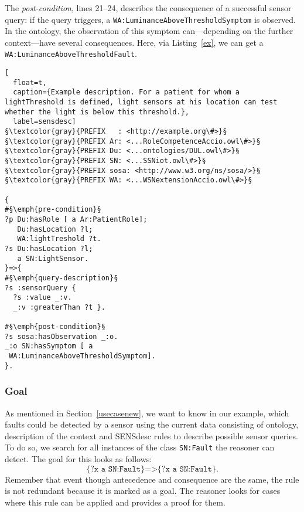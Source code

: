 The \emph{post-condition}, lines 21--24, describes the consequence of a successful sensor query: if the query triggers, a  
\texttt{WA:LuminanceAboveThresholdSymptom} is observed.
In the ontology, the observation of this symptom can---depending on the further context---have several consequences. 
Here, via Listing~\ref{ex}, we can get a \texttt{WA:LuminanceAboveThresholdFault}.

\begin{lstlisting}[
  float=t,
  caption={Example description. For a patient for whom a lightThreshold is defined, light sensors at his location can test whether the light is below this threshold.},
  label=sensdesc]
§\textcolor{gray}{PREFIX   : <http://example.org\#>}§ 
§\textcolor{gray}{PREFIX Ar: <...RoleCompetenceAccio.owl\#>}§
§\textcolor{gray}{PREFIX Du: <...ontologies/DUL.owl\#>}§
§\textcolor{gray}{PREFIX SN: <...SSNiot.owl\#>}§
§\textcolor{gray}{PREFIX sosa: <http://www.w3.org/ns/sosa/>}§
§\textcolor{gray}{PREFIX WA: <...WSNextensionAccio.owl\#>}§

{
#§\emph{pre-condition}§
?p Du:hasRole [ a Ar:PatientRole];
   Du:hasLocation ?l;
   WA:lightTreshold ?t.
?s Du:hasLocation ?l;
   a SN:LightSensor.
}=>{
#§\emph{query-description}§
?s :sensorQuery { 
  ?s :value _:v. 
  _:v :greaterThan ?t }.

#§\emph{post-condition}§
?s sosa:hasObservation _:o.
_:o SN:hasSymptom [ a 
 WA:LuminanceAboveThresholdSymptom].
}.
\end{lstlisting}


\subsubsection{Goal}
As mentioned in Section~\ref{usecasenew}, we want to know in our example, which 
faults could be detected by a sensor using the current data consisting of ontology, description of the context and SENSdesc rules to describe possible sensor queries. 
To do so, we search for all instances of the class \texttt{SN:Fault} the reasoner can detect. 
The goal for this looks as follows:
\begin{equation}\label{goal}
 \texttt{\{?x a SN:Fault\}=>\{?x a SN:Fault\}.}
\end{equation}
Remember that event though antecedence and consequence are the same, the rule 
is not redundant because it is marked
as a goal. The reasoner looks for cases where this rule can be applied and provides a proof for them.

